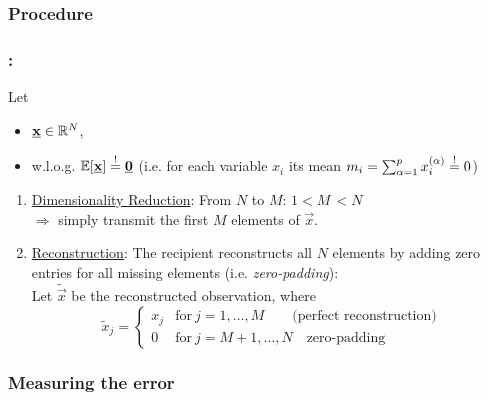 \subsubsection{Procedure}

\begin{frame}\frametitle{\subsecname:~\subsubsecname}

Let
\slidesonly{\vspace{-5mm}}
\begin{itemize}
\item[]$\underline{\mathbf{x}} \in \mathbb{R}^N$,\\
\item[] w.l.o.g. $\mathbb{E}[\underline{\mathbf{x}}] \stackrel{\mathrm{!}}{=} \underline{\mathbf{0}}$ (i.e. for each variable $x_i$ its mean $m_i = \sum_{\alpha=1}^{p} x_i^{(\alpha)} \stackrel{\mathrm{!}}{=} 0$)
\end{itemize}

\pause

\begin{enumerate}
\item \underline{Dimensionality Reduction}: From $N$ to $M$: $1 < M\, < N$\\
$\Rightarrow$ simply transmit the first $M$ elements of $\vec x$. 
\pause
\item \underline{Reconstruction}: The recipient reconstructs all $N$ elements by adding zero entries for all missing elements (i.e. \textit{zero-padding}):\\
Let $\widetilde{\vec{x}}$ be the reconstructed observation, where\\ 
 
 \begin{equation}
 \widetilde{x}_j = \begin{cases} 
      {x}_j & \text{for}~j=1,\ldots,M \qquad \text{(perfect reconstruction)} \\
      0 & \text{for}~j=M+1,\ldots,N \quad \text{zero-padding} 
   \end{cases}
 \end{equation}
\end{enumerate}


\end{frame}

\subsubsection{Measuring the error}


